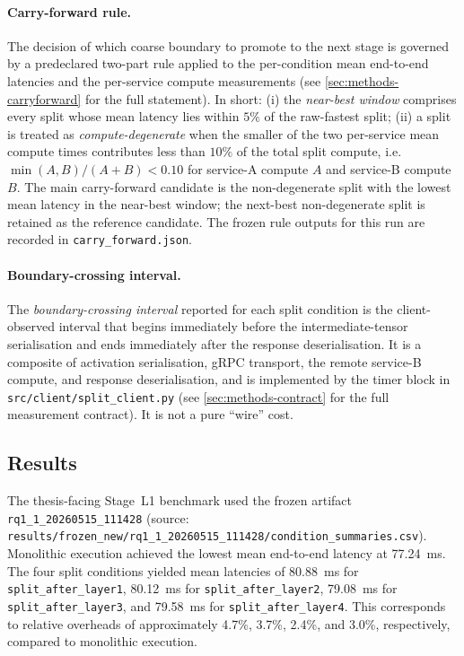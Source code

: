 \paragraph{Carry-forward rule.} The decision of which coarse boundary to promote to the next stage is governed by a predeclared two-part rule applied to the per-condition mean end-to-end latencies and the per-service compute measurements (see \cref{sec:methods-carryforward} for the full statement). In short: (i) the \emph{near-best window} comprises every split whose mean latency lies within $5\%$ of the raw-fastest split; (ii) a split is treated as \emph{compute-degenerate} when the smaller of the two per-service mean compute times contributes less than $10\%$ of the total split compute, i.e.\ $\min(A,B)/(A+B) < 0.10$ for service-A compute $A$ and service-B compute $B$. The main carry-forward candidate is the non-degenerate split with the lowest mean latency in the near-best window; the next-best non-degenerate split is retained as the reference candidate. The frozen rule outputs for this run are recorded in \texttt{carry\_forward.json}.

\paragraph{Boundary-crossing interval.} The \emph{boundary-crossing interval} reported for each split condition is the client-observed interval that begins immediately before the intermediate-tensor serialisation and ends immediately after the response deserialisation. It is a composite of activation serialisation, gRPC transport, the remote service-B compute, and response deserialisation, and is implemented by the timer block in \texttt{src/client/split\_client.py} (see \cref{sec:methods-contract} for the full measurement contract). It is not a pure ``wire'' cost.

\subsection{Results}
\label{sec:rq11-results}
The thesis-facing Stage~L1 benchmark used the frozen artifact
\texttt{rq1\_1\_20260515\_111428} (source:
\texttt{results/frozen\_new/rq1\_1\_20260515\_111428/condition\_summaries.csv}).
Monolithic execution achieved the lowest mean end-to-end latency at
77.24~ms. The four split conditions yielded mean latencies of 80.88~ms
for \texttt{split\_after\_layer1}, 80.12~ms for
\texttt{split\_after\_layer2}, 79.08~ms for \texttt{split\_after\_layer3},
and 79.58~ms for \texttt{split\_after\_layer4}. This corresponds to
relative overheads of approximately 4.7\%, 3.7\%, 2.4\%, and 3.0\%,
respectively, compared to monolithic execution.

